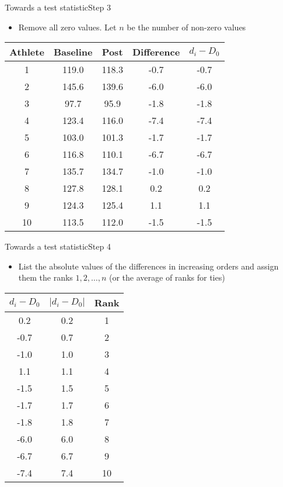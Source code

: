 \documentclass[xcolor=dvipsnames]{beamer}
\begin{document}
\begin{frame}{Towards a test statistic}{Step 3}
\begin{itemize}
\item Remove all zero values. Let $n$ be the number of non-zero values
\end{itemize}
\begin{center}
	\begin{tabular}{|c|c|c|c|c|}
		\hline
		\textbf{Athlete} &  \textbf{Baseline} &      \textbf{Post}    & \textbf{Difference} & $d_i -D_0$ \\ \hline 
		\hline
		1  &     119.0 &  118.3 &  -0.7 & -0.7\\ \hline
		2   &    145.6 &  139.6 &  -6.0 & -6.0\\ \hline
		3    &    97.7 &   95.9 &  -1.8 &  -1.8\\ \hline
		4    &   123.4 &  116.0 &  -7.4&  -7.4\\ \hline
		5    &   103.0 &  101.3 &  -1.7&  -1.7\\ \hline
		6    &   116.8 &  110.1 &  -6.7&  -6.7\\ \hline
		7     &  135.7 &  134.7 &  -1.0&  -1.0\\ \hline
		8     &  127.8 &  128.1 &   0.2&   0.2\\ \hline
		9     &  124.3 &  125.4 &   1.1&   1.1\\ \hline
		10    &  113.5 &  112.0 &  -1.5&  -1.5\\ \hline
	\end{tabular}
\end{center}
\end{frame}

\begin{frame}{Towards a test statistic}{Step 4}
\begin{itemize}
	\item List the absolute values of the differences in increasing orders and assign them the ranks $1, 2, \hdots, n$ (or the average of ranks for ties)
\end{itemize}
\begin{center}
	\begin{tabular}{|c|c|c|}
		\hline
		$d_i -D_0$ & \textbf{$|d_i - D_0|$} &  \textbf{Rank}  \\ \hline \hline
   0.2 & 0.2 &     1\\ \hline
  -0.7  &0.7  &    2\\ \hline
  -1.0  &1.0  &    3\\ \hline
   1.1  & 1.1  &    4\\ \hline
  -1.5  & 1.5  &    5\\ \hline
  -1.7  &1.7  &    6\\ \hline
  -1.8  & 1.8  &    7\\ \hline
  -6.0  & 6.0  &    8\\ \hline
  -6.7  & 6.7  &    9\\ \hline
  -7.4  &7.4  &   10\\ \hline
	\end{tabular}
\end{center}
\end{frame}
\end{document}
